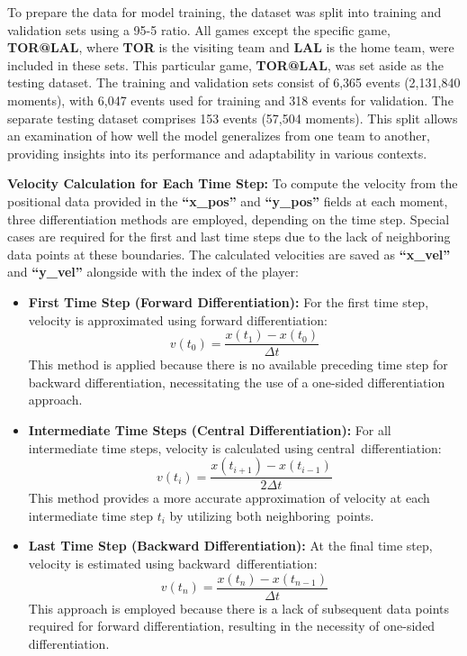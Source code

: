 To prepare the data for model training, the dataset was split into training and validation sets using a 95-5 ratio. All games except the specific game, \textbf{TOR@LAL}, where \textbf{TOR} is the visiting team and \textbf{LAL} is the home team, were included in these sets. This particular game, \textbf{TOR@LAL}, was set aside as the testing dataset. The training and validation sets consist of 6,365 events (2,131,840 moments), with 6,047 events used for training and 318 events for validation. The separate testing dataset comprises 153 events (57,504 moments). This split allows an examination of how well the model generalizes from one team to another, providing insights into its performance and adaptability in various contexts.

\textbf{Velocity Calculation for Each Time Step:}  
To compute the velocity from the positional data provided in the \textbf{``x\_pos''} and \textbf{``y\_pos''} fields at each moment, three differentiation methods are employed, depending on the time step. Special cases are required for the first and last time steps due to the lack of neighboring data points at these boundaries. The calculated velocities are saved as \textbf{``x\_vel''} and \textbf{``y\_vel''} alongside with the index of the player:

\begin{itemize}
    \item \textbf{First Time Step (Forward Differentiation):} For the first time step, velocity is approximated using forward differentiation:
    \[
    v(t_0) = \frac{x(t_1) - x(t_0)}{\Delta t}
    \]
This method is applied because there is no available preceding time step for backward differentiation, necessitating the use of a one-sided differentiation approach.

    \item \textbf{Intermediate Time Steps (Central Differentiation):} For all intermediate time steps, velocity is calculated using central~differentiation:
    \[
    v(t_i) = \frac{x(t_{i+1}) - x(t_{i-1})}{2 \Delta t}
    \]
    This method provides a more accurate approximation of velocity at each intermediate time step \( t_i \) by utilizing both neighboring~points.

    \item \textbf{Last Time Step (Backward Differentiation):} At the final time step, velocity is estimated using backward~differentiation:
    \[
    v(t_n) = \frac{x(t_n) - x(t_{n-1})}{\Delta t}
    \]
    This approach is employed because there is a lack of subsequent data points required for forward differentiation, resulting in the necessity of one-sided differentiation.
\end{itemize}


